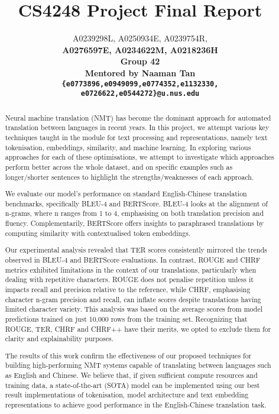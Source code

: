 \documentclass[11pt]{article}
\title{CS4248 Project Final Report}
\author{A0239298L, A0250934E, A0239754R, \\ \bf A0276597E, A0234622M, A0218236H \\
  Group 42 \\
  Mentored by Naaman Tan \\
  \texttt{\{e0773896,e0949099,e0774352,e1132330,}\\
  \texttt{e0726622,e0544272\}@u.nus.edu}}
\begin{document}
 
\maketitle 

\begin{abstract}

Neural machine translation (NMT) has become the dominant approach for automated
translation between languages in recent years. In this project, we attempt
various key techniques taught in the module for text processing and
representations, namely text tokenisation, embeddings, similarity, and machine
learning. In exploring various approaches for each of these optimisations, we
attempt to investigate which approaches perform better across the whole
dataset, and on specific examples such as longer/shorter sentences to highlight
the strengths/weaknesses of each approach.

We evaluate our model’s performance on standard English-Chinese translation
benchmarks, specifically BLEU-4 and BERTScore. BLEU-4 looks at the alignment of
n-grams, where n ranges from 1 to 4, emphasising on both translation precision
and fluency. Complementarily, BERTScore offers insights to paraphrased
translations by computing similarity with contextualised token embeddings. 

Our experimental analysis revealed that TER scores consistently mirrored the
trends observed in BLEU-4 and BERTScore evaluations. In contrast, ROUGE and
CHRF metrics exhibited limitations in the context of our translations,
particularly when dealing with repetitive characters. ROUGE does not penalise
repetition unless it impacts recall and precision relative to the reference,
while CHRF, emphasising character n-gram precision and recall, can inflate
scores despite translations having limited character variety. This analysis was
based on the average scores from model predictions trained on just 10,000 rows
from the training set. Recognizing that ROUGE, TER, CHRF and CHRF++ have their
merits, we opted to exclude them for clarity and explainability purposes. 

The results of this work confirm the effectiveness of our proposed techniques
for building high-performing NMT systems capable of translating between
languages such as English and Chinese. We believe that, if given sufficient
compute resources and training data, a state-of-the-art (SOTA) model can be
implemented using our best result implementations of tokenisation, model
architecture and text embedding representations to achieve good performance in
the English-Chinese translation task.
    
\end{abstract}
\end{document}
